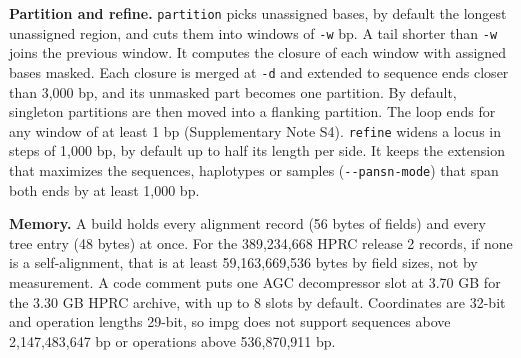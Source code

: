 \textbf{Partition and refine.}
\texttt{partition} picks unassigned bases, by default the longest unassigned region, and cuts them into windows of \texttt{-w} bp.
A tail shorter than \texttt{-w} joins the previous window.
It computes the closure of each window with assigned bases masked.
Each closure is merged at \texttt{-d} and extended to sequence ends closer than 3,000 bp, and its unmasked part becomes one partition.
By default, singleton partitions are then moved into a flanking partition.
The loop ends for any window of at least 1 bp (Supplementary Note S4).
\texttt{refine} widens a locus in steps of 1,000 bp, by default up to half its length per side.
It keeps the extension that maximizes the sequences, haplotypes or samples (\texttt{-{}-pansn-mode}) that span both ends by at least 1,000 bp.

\textbf{Memory.}
A build holds every alignment record (56 bytes of fields) and every tree entry (48 bytes) at once.
For the 389,234,668 HPRC release 2 records, if none is a self-alignment, that is at least 59,163,669,536 bytes by field sizes, not by measurement.
A code comment puts one AGC decompressor slot at 3.70 GB for the 3.30 GB HPRC archive, with up to 8 slots by default.
Coordinates are 32-bit and operation lengths 29-bit, so impg does not support sequences above 2,147,483,647 bp or operations above 536,870,911 bp.
